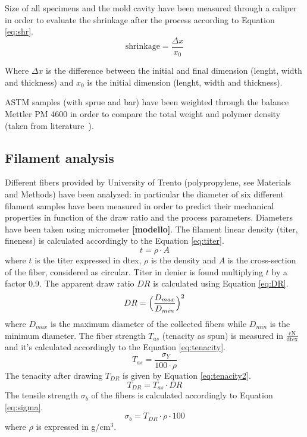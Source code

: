 \documentclass[a4paper, 11pt]{article}
\begin{document}
Size of all specimens and the mold cavity have been measured through a caliper in order to evaluate the shrinkage after the process according to Equation \ref{eq:shr}.
\begin{equation}
\text{shrinkage} = \frac{\Delta x}{x_0}
\label{eq:shr}
\end{equation}

Where $\Delta x$ is the difference between the initial and final dimension (lenght, width and thickness) and $x_0$ is the initial dimension (lenght, width and thickness). 

ASTM samples (with sprue and bar) have been weighted through the balance Mettler PM 4600 in order to compare the total weight and polymer density (taken from literature~\cite{handbook}).

\subsection{Filament analysis}

Different fibers provided by University of Trento (polypropylene, see Materials and Methods) have been analyzed: in particular the diameter of six different filament samples have been measured in order to predict their mechanical properties in function of the draw ratio and the process parameters. 
Diameters have been taken using micrometer \textbf{[modello]}. The filament linear density (titer, fineness) is calculated accordingly to the Equation \ref{eq:titer}. 
\begin{equation}
	t = \rho \cdot A
	\label{eq:titer}
\end{equation}
where $t$ is the titer expressed in dtex, $\rho$ is the density and $A$ is the cross-section of the fiber, considered as circular. Titer in denier is found multiplying $t$ by a factor 0.9. The apparent draw ratio $DR$ is calculated using Equation \ref{eq:DR}. 
\begin{equation}
	DR = \Bigl(\frac{D_{max}}{D_{min}}\Bigr)^2
	\label{eq:DR}
\end{equation}
where $D_{max}$ is the maximum diameter of the collected fibers while $D_{min}$ is the minimum diameter. The fiber strength $T_{as}$ (tenacity as spun) is measured in $\frac{\text{cN}}{\text{dtex}}$ and it's calculated accordingly to the Equation \ref{eq:tenacity}. 
\begin{equation}
	T_{as} = \frac{\sigma_Y}{100\cdot \rho}
	\label{eq:tenacity}
\end{equation}
The tenacity after drawing $T_{DR}$ is given by Equation \ref{eq:tenacity2}. 
\begin{equation}
	T_{DR} = T_{as}\cdot DR
	\label{eq:tenacity2}
\end{equation}
The tensile strength $\sigma_b$ of the fibers is calculated accordingly to Equation \ref{eq:sigma}.
\begin{equation}
	\sigma_{b} = T_{DR}\cdot \rho \cdot 100
	\label{eq:sigma}
\end{equation}
where $\rho$ is expressed in g/cm$^3$. 
\end{document}
